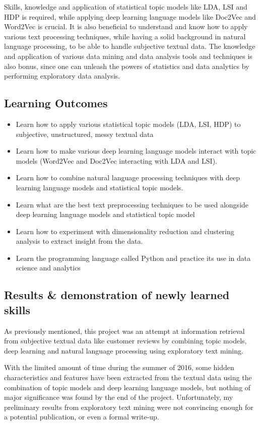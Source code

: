 \documentclass[12pt]{article} %
\begin{document}
Skills, knowledge and application of statistical topic models like LDA, LSI and HDP is required, while applying deep learning language models like Doc2Vec and Word2Vec is crucial. It is also beneficial to understand and know how to apply various text processing techniques, while having a solid background in natural language processing, to be able to handle subjective textual data. The knowledge and application of various data mining and data analysis tools and techniques is also bonus, since one can unleash the powers of statistics and data analytics by performing exploratory data analysis. 

\subsection{Learning Outcomes} %
\begin{itemize}
    \item Learn how to apply various statistical topic models (LDA, LSI, HDP) to subjective, unstructured, messy textual data 
    \item Learn how to make various deep learning language models interact with topic models (Word2Vec and Doc2Vec interacting with LDA and LSI).
    \item Learn how to combine natural language processing techniques with deep learning language models and statistical topic models.
    \item Learn what are the best text preprocessing techniques to be used alongside deep learning language models and statistical topic model
    \item Learn how to experiment with dimensionality reduction and clustering analysis to extract insight from the data.
    \item Learn the programming language called Python and practice its use in data science and analytics
  \end{itemize}
  
\subsection{Results \& demonstration of newly learned skills} %
As previously mentioned, this project was an attempt at information retrieval from subjective textual data like customer reviews by combining topic models, deep learning and natural language processing using exploratory text mining.

With the limited amount of time during the summer of 2016, some hidden characteristics and features have been extracted from the textual data using the combination of topic models and deep learning language models, but nothing of major significance was found by the end of the project. Unfortunately, my preliminary results from exploratory text mining were not convincing enough for a potential publication, or even a formal write-up. 
\end{document}
